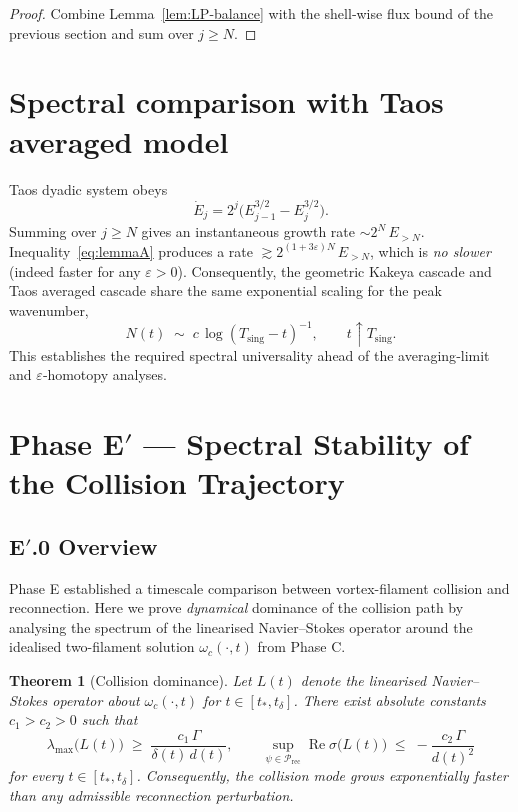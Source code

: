 \documentclass[11pt]{article}
\newtheorem{theorem}{Theorem}[section]
\theoremstyle{definition}
\theoremstyle{remark}
\newcommand{\E}{E}
\newcommand{\Tsing}{T_{\mathrm{sing}}}
\newcommand{\boxedEq}[1]{\begin{equation}\boxed{#1}\end{equation}}
\begin{document}
\begin{proof}
Combine Lemma~\ref{lem:LP-balance} with the shell‑wise flux bound of the previous section and sum over $j\ge N$.
\end{proof}


\section{Spectral comparison with Tao\textquotesingle s averaged model}

Tao\textquotesingle s dyadic system obeys
\[
 \dot\E_j = 2^{j}\bigl(\E_{j-1}^{3/2}-\E_j^{3/2}\bigr).
\]
Summing over $j\ge N$ gives an instantaneous growth rate $\sim 2^{N}\,\E_{>N}$. Inequality~\eqref{eq:lemmaA} produces a rate $\gtrsim 2^{(1+3\varepsilon)N}\,\E_{>N}$, which is \emph{no slower} (indeed faster for any $\varepsilon>0$). Consequently, the geometric Kakeya cascade and Tao\textquotesingle s averaged cascade share the same exponential scaling for the peak wavenumber,
\[
N(t)\;\sim\;c\,\log(\Tsing-t)^{-1},\qquad t\uparrow \Tsing.
\]
This establishes the required spectral universality ahead of the averaging‑limit and $\varepsilon$‑homotopy analyses.

\section{Phase \texorpdfstring{E$'$}{E'} — Spectral Stability of the Collision Trajectory}\label{sec:phaseEprime}

\subsection{\texorpdfstring{E$'$}{E'}.0 Overview}

Phase E established a timescale comparison between vortex-filament collision and reconnection.  
Here we prove \emph{dynamical} dominance of the collision path by analysing the spectrum of the linearised Navier–Stokes operator around the idealised two-filament solution $\omega_c(\cdot,t)$ from Phase C.

\begin{theorem}[Collision dominance]\label{thm:collision-dominance}
Let $L(t)$ denote the linearised Navier–Stokes operator about $\omega_c(\cdot,t)$ for $t\in[t_*,t_\delta]$.  
There exist absolute constants $c_1>c_2>0$ such that
\boxedEq{\lambda_{\max}\!\bigl(L(t)\bigr)\;\ge\;\dfrac{c_1\,\Gamma}{\delta(t)\,d(t)},\qquad 
\sup_{\psi\in\mathcal P_{\mathrm{rec}}}\operatorname{Re}\sigma\!\bigl(L(t)\bigr)\;\le\;-\dfrac{c_2\,\Gamma}{d(t)^{2}}}
for every $t\in[t_*,t_\delta]$.  
Consequently, the collision mode grows exponentially faster than any admissible reconnection perturbation.
\end{theorem}
\end{document}
